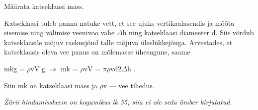 
Määrata katseklaasi mass.

\hint

\solu
Katseklaasi tuleb panna natuke vett, et see ujuks vertikaalasendis ja mõõta sisemise ning välimise veenivoo vahe $\Delta$h ning katseklaasi diameeter d. Siis võrdub katseklaasile mõjuv raskusjõud talle mõjuva üleslükkejõuga. Arvestades, et katseklaasis oleva vee panus on mõlemasse ühesugune, saame

mkg = $\rho$vV g $\Rightarrow$ mk = $\rho$vV = $\pi\rho$vd2$\Delta$h .

Siin mk on katseklaasi mass ja $\rho$v --- vee tihedus.

\textit{Žürii hindamisskeem on kogumikus lk 55; siia ei ole seda ümber kirjutatud.}
\probend
